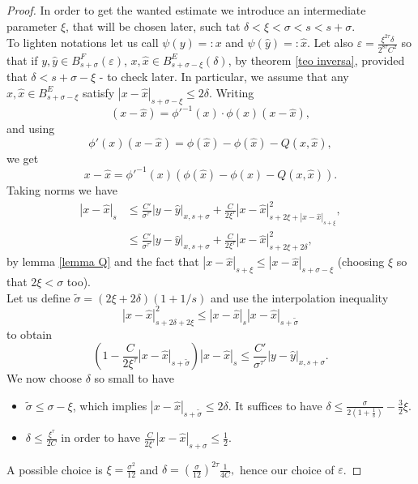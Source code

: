 \documentclass[oneside, 11pt]{amsbook}
\newcommand{\pa}[1]{{\left(#1\right)}}
\newcommand{\abs}[1]{{\left|#1\right|}}
\newcommand{\eps}{\varepsilon}
\newcommand{\inderiv}[1]{#1'^{-1}}
\newcommand{\0}{{(0)}}
\newcommand{\3}{{(3)}}
\numberwithin{equation}{section}
\numberwithin{defn}{section}
\numberwithin{prop}{section}
\numberwithin{cor}{section}
\numberwithin{lemma}{section}
\numberwithin{rmk}{section}
\numberwithin{corollary}{section}
\begin{document}
\begin{proof}
In order to get the wanted estimate we introduce an intermediate  parameter $\xi$, that will be chosen later, such tat $\delta<\xi<\sigma<s<s+\sigma$.\\ 
To lighten notations let us call $\psi(y)=: x$ and $\psi(\hat{y})=: \hat{x}$. Let also $\eps=\frac{\xi^{2\tau}\delta}{2^{8\tau}C^2}$ so that if $y,\hat{y}\in B^{F}_{s+\sigma}(\eps)$, $x,\hat{x}\in B^E_{s+\sigma -\xi}(\delta)$, by theorem \ref{teo inversa}, provided that $\delta< s + \sigma -\xi$ - to check later. In particular, we assume that any $x,\hat{x}\in B^{E}_{s + \sigma -\xi}$ satisfy $\abs{x - \hat{x}}_{s+\sigma - \xi}\leq 2\delta.$
Writing \[(x-\hat{x})=\phi'^{-1}(x)\cdot\phi(x)(x-\hat{x}),\]
and using $$\phi'(x)(x-\hat{x})= \phi(\hat{x})-\phi(\hat{x})-Q(x,\hat{x}),$$ we get \[ x-\hat{x}= \inderiv{\phi}(x)\pa{\phi(\hat{x}) - \phi(x) - Q(x,\hat{x})}.\]
Taking norms we have
 \begin{align*}
\abs{x-\hat{x}}_s  &\leq \frac{C'}{\sigma^{\tau'}}\abs{y - \hat{y}}_{x,s+\sigma} + \frac{C}{2\xi^{\tau}}\abs{x-\hat{x}}^2_{s+2\xi + \abs{x-\hat{x}}_{s + \xi}},\\
&\leq \frac{C'}{\sigma^{\tau'}}\abs{y - \hat{y}}_{x,s+\sigma} + \frac{C}{2\xi^{\tau}}\abs{x-\hat{x}}^2_{s+2\xi + 2\delta},
\end{align*} 
 by lemma \ref{lemma Q} and the fact that $\abs{x-\hat{x}}_{s+\xi}\leq\abs{x-\hat{x}}_{s+\sigma-\xi}$ (choosing $\xi$ so that $2\xi< \sigma $ too). \\ Let us define $\tilde{\sigma}=(2\xi + 2\delta)(1 + 1/s)$ and use the interpolation inequality \[\abs{x-\hat{x}}^2_{s+2\delta +2\xi}\leq\abs{x-\hat{x}}_s\abs{x-\hat{x}}_{s+\tilde{\sigma}}\] to obtain \[(1 - \frac{C}{2\xi^\tau}\abs{x-\hat{x}}_{s+\tilde{\sigma}})\abs{x-\hat{x}}_s\leq \frac{C'}{\sigma^{\tau'}}\abs{y-\hat{y}}_{x,s+\sigma}.\]
We now choose $\delta$ so small to have
\begin{itemize}[leftmargin=*]
\item $\tilde{\sigma}\leq\sigma - \xi$, which implies $\abs{x-\hat{x}}_{s+\tilde{\sigma}}\leq 2\delta$. It suffices to have $\delta\leq\frac{\sigma}{2(1+\frac{1}{s})} - \frac{3}{2}\xi$.
\item $\delta\leq\frac{\xi^{\tau}}{2C}$ in order to have $\frac{C}{2\xi^\tau}\abs{x-\hat{x}}_{s+\sigma}\leq\frac{1}{2}.$
\end{itemize}
A possible choice is $\xi = \frac{\sigma^2}{12}$ and $\delta = \pa{\frac{\sigma}{12}}^{2\tau}\frac{1}{4C},$ hence our choice of $\eps$.
\end{proof}
\end{document}

